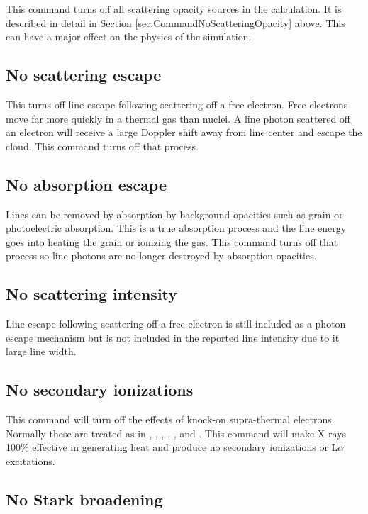 This command turns off all scattering opacity sources in the calculation.  It is described in detail in
Section \ref{sec:CommandNoScatteringOpacity} above.
This can have a major effect on the physics of the simulation.

\subsection{No scattering escape}

This turns off line escape following scattering off a free electron.
Free electrons move far more quickly in a thermal gas than nuclei.
A line photon scattered off an electron will receive a large Doppler shift away
from line center and escape the cloud.  This command turns off that process.

\subsection{No absorption escape}

Lines can be removed by absorption by background opacities such as grain
or photoelectric absorption.  
This is a true absorption process and the line energy goes into heating the
grain or ionizing the gas. 
This command turns off that process so line photons are no longer
destroyed by absorption opacities.

\subsection{No scattering intensity}

Line escape following scattering off a free electron is still included as a photon escape mechanism
but is not included in the reported line intensity due to it large line width.


\subsection{No secondary ionizations}

This command will turn off the effects of knock-on supra-thermal
electrons.
Normally these are treated as in \citet{Spitzer1968},
\citet{Bergeron1971}, \citet{Shull1979}, \citet{Shull1985}, \citet{Xu1991},
and \citet{Dalgarno1999}.
This command
will make X-rays 100\% effective in generating heat and
produce no secondary
ionizations or L$\alpha $ excitations.

\subsection{No Stark broadening}

